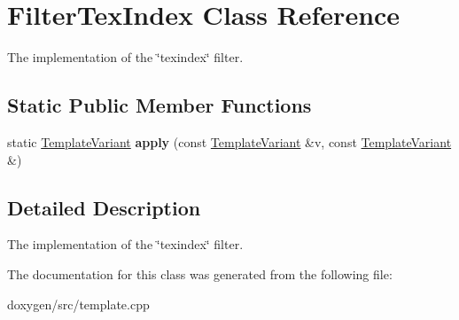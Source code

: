 \hypertarget{class_filter_tex_index}{}\section{Filter\+Tex\+Index Class Reference}
\label{class_filter_tex_index}


The implementation of the \char`\"{}texindex\char`\"{} filter.  


\subsection*{Static Public Member Functions}
\begin{DoxyCompactItemize}
\item 
\mbox{\label{class_filter_tex_index_a3890ddb331b5b47bf31895728adc4c8c}} 
static \mbox{\hyperlink{class_template_variant}{Template\+Variant}} {\bfseries apply} (const \mbox{\hyperlink{class_template_variant}{Template\+Variant}} \&v, const \mbox{\hyperlink{class_template_variant}{Template\+Variant}} \&)
\end{DoxyCompactItemize}


\subsection{Detailed Description}
The implementation of the \char`\"{}texindex\char`\"{} filter. 

The documentation for this class was generated from the following file\+:\begin{DoxyCompactItemize}
\item 
doxygen/src/template.\+cpp\end{DoxyCompactItemize}
